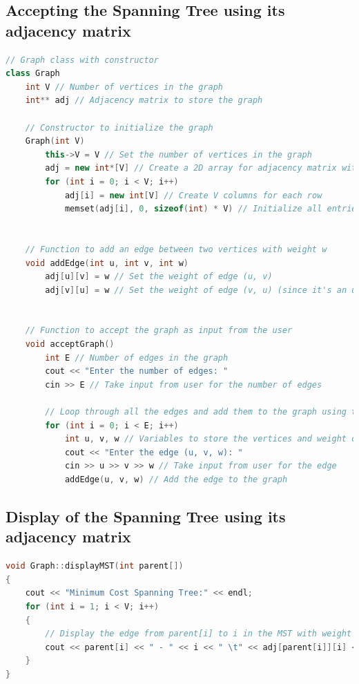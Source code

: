 \documentclass[11pt]{article}
\begin{document}
\subsection{Accepting the Spanning Tree using its adjacency matrix}
\begin{lstlisting}[language=C++]
// Graph class with constructor
class Graph
    int V // Number of vertices in the graph
    int** adj // Adjacency matrix to store the graph
    
    // Constructor to initialize the graph
    Graph(int V)
        this->V = V // Set the number of vertices in the graph
        adj = new int*[V] // Create a 2D array for adjacency matrix with V rows
        for (int i = 0; i < V; i++)
            adj[i] = new int[V] // Create V columns for each row
            memset(adj[i], 0, sizeof(int) * V) // Initialize all entries in the matrix to 0
    

    // Function to add an edge between two vertices with weight w
    void addEdge(int u, int v, int w)
        adj[u][v] = w // Set the weight of edge (u, v)
        adj[v][u] = w // Set the weight of edge (v, u) (since it's an undirected graph)
    

    // Function to accept the graph as input from the user
    void acceptGraph()
        int E // Number of edges in the graph
        cout << "Enter the number of edges: "
        cin >> E // Take input from user for the number of edges

        // Loop through all the edges and add them to the graph using the addEdge function
        for (int i = 0; i < E; i++)
            int u, v, w // Variables to store the vertices and weight of the edge
            cout << "Enter the edge (u, v, w): "
            cin >> u >> v >> w // Take input from user for the edge
            addEdge(u, v, w) // Add the edge to the graph

\end{lstlisting}
\subsection{Display of the Spanning Tree using its adjacency matrix}
\begin{lstlisting}[language=C++]
void Graph::displayMST(int parent[])
{
    cout << "Minimum Cost Spanning Tree:" << endl;
    for (int i = 1; i < V; i++)
    {
        // Display the edge from parent[i] to i in the MST with weight adj[parent[i]][i]
        cout << parent[i] << " - " << i << " \t" << adj[parent[i]][i] << endl;
    }
}
\end{lstlisting}
\end{document}
